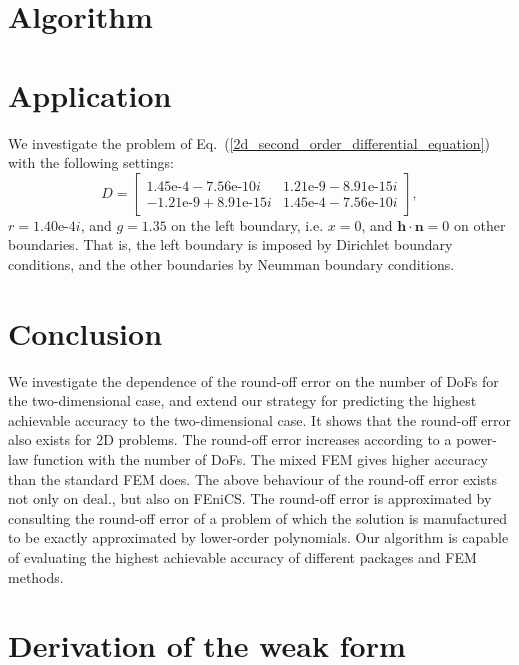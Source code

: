 \documentclass[review,3p]{elsarticle}
\begin{document}
\section{Algorithm}					\label{section_algorithm}

\section{Application}					\label{section_validation}
We investigate the problem of Eq.~(\ref{2d_second_order_differential_equation}) with the following settings:
\begin{equation*} \label{d_validation}
  D=
  \begin{bmatrix}
   1.45\text{e-}4-7.56\text{e-}10i & 1.21\text{e-}9-8.91\text{e-}15i \\
    -1.21\text{e-}9+8.91\text{e-}15i & 1.45\text{e-}4-7.56\text{e-}10i
  \end{bmatrix},
\end{equation*}
$r=1.40\text{e-}4i$, and $g=1.35$ on the left boundary, i.e. $x=0$, and $\mathbf{h} \cdot \mathbf{n} =0$ on other boundaries.
That is, the left boundary is imposed by Dirichlet boundary conditions, and the other boundaries by Neumman boundary conditions.
\section{Conclusion}					\label{paragraph_on_conclusion}

We investigate the dependence of the round-off error on the number of DoFs for the two-dimensional case, and extend our strategy for predicting the highest achievable accuracy to the two-dimensional case. It shows that the round-off error also exists for 2D problems. The round-off error increases according to a power-law function with the number of DoFs. The mixed FEM gives higher accuracy than the standard FEM does. The above behaviour of the round-off error exists not only on deal., but also on FEniCS. The round-off error is approximated by consulting the round-off error of a problem of which the solution is manufactured to be exactly approximated by lower-order polynomials. Our algorithm is capable of evaluating the highest achievable accuracy of different packages and FEM methods.

\appendix

\section{Derivation of the weak form}		\label{weak form appendix}
\end{document}
